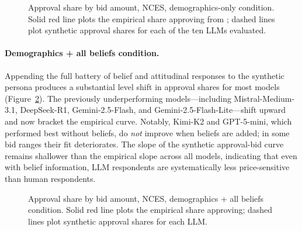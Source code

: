 \documentclass[12pt]{article}
\begin{document}
\begin{figure}[h]
    \centering
    \caption{Approval share by bid amount, NCES, demographics-only condition. Solid red line plots the empirical share approving from \textcite{Aldy2012}; dashed lines plot synthetic approval shares for each of the ten LLMs evaluated.}
    \label{fig:nces-demo-only}
\end{figure}

\paragraph{Demographics + all beliefs condition.} Appending the full battery of belief and attitudinal responses to the synthetic persona produces a substantial level shift in approval shares for most models (Figure~\ref{fig:nces-all-beliefs}). The previously underperforming models---including Mistral-Medium-3.1, DeepSeek-R1, Gemini-2.5-Flash, and Gemini-2.5-Flash-Lite---shift upward and now bracket the empirical curve. Notably, Kimi-K2 and GPT-5-mini, which performed best without beliefs, do \emph{not} improve when beliefs are added; in some bid ranges their fit deteriorates. The slope of the synthetic approval-bid curve remains shallower than the empirical slope across all models, indicating that even with belief information, LLM respondents are systematically less price-sensitive than human respondents.

\begin{figure}[h]
    \centering
    \caption{Approval share by bid amount, NCES, demographics + all beliefs condition. Solid red line plots the empirical share approving; dashed lines plot synthetic approval shares for each LLM.}
    \label{fig:nces-all-beliefs}
\end{figure}
\end{document}
